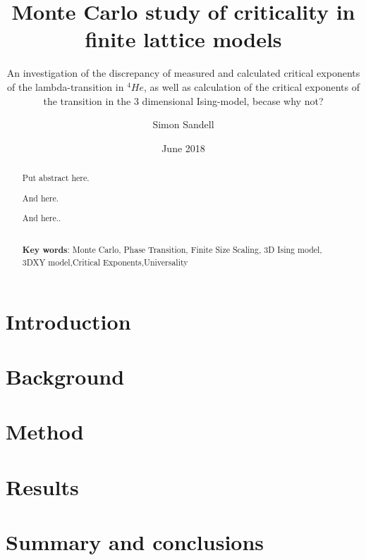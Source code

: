 \documentclass[nocoverpage,swedish,g5paper]{thesis}
\title{Monte Carlo study of criticality in finite lattice models}
\author{Simon Sandell}
\date{June 2018}
\subtitle{An investigation of the discrepancy of measured and calculated critical exponents of the lambda-transition in $^{4}He$, as well as calculation of the critical exponents of the transition in the 3 dimensional Ising-model, becase why not?}
\newcommand{\todo}[1]{(\textbf{TODO:} #1)}
\begin{document}

\begin{abstract}
Put abstract here.

And here.

And here..
\\\noindent \strut \\
{\bf Key words}: Monte Carlo, Phase Transition, Finite Size Scaling, 3D Ising model, 3DXY model,Critical Exponents,Universality
\end{abstract}


\begin{preface}

\end{preface}

\tableofcontents

\mainmatter


\chapter{Introduction}


\chapter{Background}\label{ch:Background}


\chapter{Method}\label{ch:Method}


\chapter{Results}\label{ch:Results}


\chapter{Summary and conclusions}\label{ch:Summary}



%





%
\end{document}
